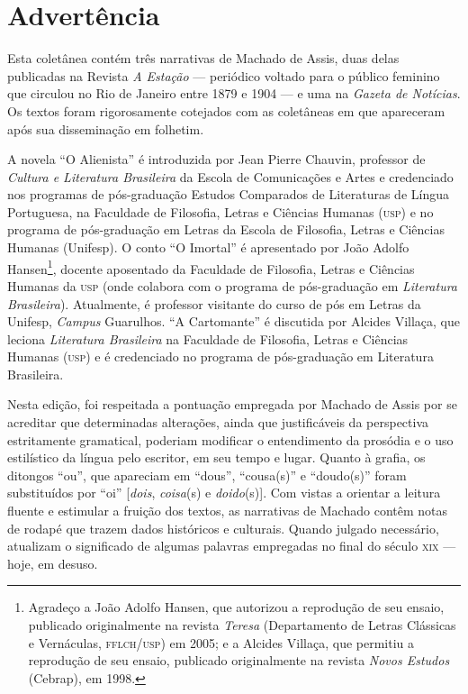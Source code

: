 \chapter{Advertência}

Esta coletânea contém três narrativas de Machado de Assis, duas delas
publicadas na Revista \emph{A Estação} --- periódico voltado para o
público feminino que circulou no Rio de Janeiro entre 1879 e 1904 --- e
uma na \emph{Gazeta de Notícias}. Os textos foram rigorosamente
cotejados com as coletâneas em que apareceram após sua disseminação em
folhetim.

A novela ``O Alienista'' é introduzida por Jean Pierre Chauvin,
professor de \emph{Cultura e Literatura Brasileira} da Escola de
Comunicações e Artes e credenciado nos programas de pós-graduação
Estudos Comparados de Literaturas de Língua Portuguesa, na Faculdade de
Filosofia, Letras e Ciências Humanas (\textsc{usp}) e no programa de
pós-graduação em Letras da Escola de Filosofia, Letras e Ciências
Humanas (Unifesp). O conto ``O Imortal'' é apresentado por João Adolfo
Hansen\footnote{Agradeço a João Adolfo Hansen, que autorizou a
  reprodução de seu ensaio, publicado originalmente na revista
  \emph{Teresa} (Departamento de Letras Clássicas e Vernáculas,
  \textsc{fflch}/\textsc{usp}) em 2005; e a Alcides Villaça, que permitiu a reprodução de
  seu ensaio, publicado originalmente na revista \emph{Novos Estudos}
  (Cebrap), em 1998.}, docente aposentado da Faculdade de Filosofia,
Letras e Ciências Humanas da \textsc{usp} (onde colabora com o programa de
pós-graduação em \emph{Literatura Brasileira}). Atualmente, é professor
visitante do curso de pós em Letras da Unifesp, \emph{Campus} Guarulhos.
``A Cartomante'' é discutida por Alcides Villaça, que leciona
\emph{Literatura Brasileira} na Faculdade de Filosofia, Letras e
Ciências Humanas (\textsc{usp}) e é credenciado no programa de pós-graduação em
Literatura Brasileira.

Nesta edição, foi respeitada a pontuação empregada por Machado de Assis
por se acreditar que determinadas alterações, ainda que justificáveis da
perspectiva estritamente gramatical, poderiam modificar o entendimento
da prosódia e o uso estilístico da língua pelo escritor, em seu tempo e
lugar. Quanto à grafia, os ditongos ``ou'', que apareciam em ``dous'',
``cousa(s)'' e ``doudo(s)'' foram substituídos por ``oi''
{[}\emph{dois}, \emph{coisa}(s) e \emph{doido}(s){]}. Com vistas a
orientar a leitura fluente e estimular a fruição dos textos, as
narrativas de Machado contêm notas de rodapé que trazem dados históricos
e culturais. Quando julgado necessário, atualizam o significado de
algumas palavras empregadas no final do século \textsc{xix} --- hoje, em desuso.

